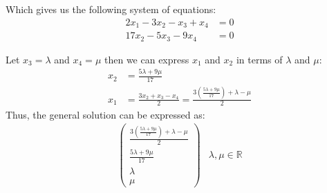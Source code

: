 \documentclass{article}
\begin{document}
Which gives us the following system of equations:
\begin{align*}
2x_1 - 3x_2 - x_3 + x_4 &= 0 \\
17x_2 - 5x_3 - 9x_4 &= 0
\end{align*}

Let \(x_3 = \lambda\) and \(x_4 = \mu\) then we can express \(x_1\) and \(x_2\) in terms of \(\lambda\) and \(\mu\):
\begin{align*}
x_2 &= \frac{5\lambda + 9\mu}{17} \\
x_1 &= \frac{3x_2 + x_3 - x_4}{2} = \frac{3\left(\frac{5\lambda + 9\mu}{17}\right) + \lambda - \mu}{2}
\end{align*}
Thus, the general solution can be expressed as:
\begin{align*}
\begin{pmatrix}
\frac{3\left(\frac{5\lambda + 9\mu}{17}\right) + \lambda - \mu}{2} \\
\frac{5\lambda + 9\mu}{17} \\
\lambda \\
\mu
\end{pmatrix} & \lambda, \mu \in \mathbb{R}
\end{align*}
\end{document}
